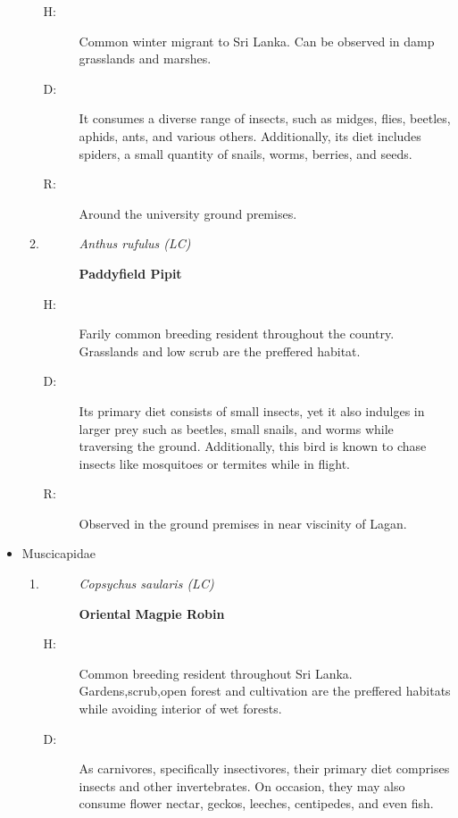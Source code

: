 \begin{itemize}
\begin{enumerate}
\begin{description}%
\item[H: ]%
Common winter migrant to Sri Lanka. Can be observed in damp grasslands and marshes.%
\item[D: ]%
It consumes a diverse range of insects, such as midges, flies, beetles, aphids, ants, and various others. Additionally, its diet includes spiders, a small quantity of snails, worms, berries, and seeds.%
\item[R: ]%
Around the university ground premises.%
\end{description}%
\item%
\begin{description}%
\item[]%
\textit{Anthus rufulus (LC)}%
\item[]%
\textbf{Paddyfield Pipit}%
\end{description}%
\begin{description}%
\item[H: ]%
Farily common breeding resident throughout the country. Grasslands and low scrub are the preffered habitat.%
\item[D: ]%
Its primary diet consists of small insects, yet it also indulges in larger prey such as beetles, small snails, and worms while traversing the ground. Additionally, this bird is known to chase insects like mosquitoes or termites while in flight.%
\item[R: ]%
Observed in the ground premises in near viscinity of Lagan.%
\end{description}%
\end{enumerate}%
\item%
Muscicapidae%
\begin{enumerate}%
\item%
\begin{description}%
\item[]%
\textit{Copsychus saularis (LC)}%
\item[]%
\textbf{Oriental Magpie Robin}%
\end{description}%
\begin{description}%
\item[H: ]%
Common breeding resident throughout Sri Lanka. Gardens,scrub,open forest and cultivation are the preffered habitats while avoiding interior of wet forests.%
\item[D: ]%
As carnivores, specifically insectivores, their primary diet comprises insects and other invertebrates. On occasion, they may also consume flower nectar, geckos, leeches, centipedes, and even fish.%

\end{description}
\end{enumerate}
\end{itemize}
